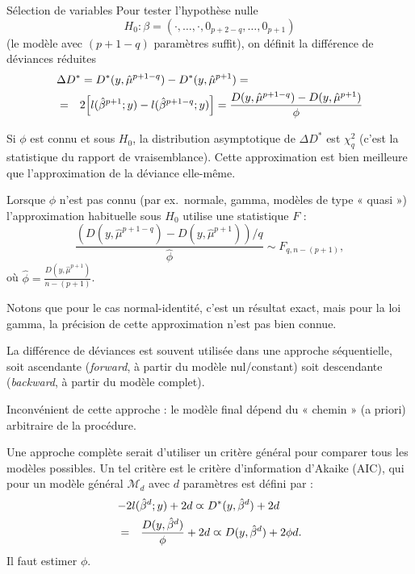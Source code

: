 \documentclass{BeamerTemplate}
\begin{document}
\begin{refsection}
\begin{frame}{Sélection de variables}
\bigskip
Pour tester l'hypothèse nulle
$$H_0: \beta = (\cdot, \ldots, \cdot, 0_{p+2-q},\ldots,0_{p+1})$$
(le modèle avec $(p+1-q)$ paramètres suffit), on
définit la différence de déviances réduites
\begin{eqnarray*}
  \lefteqn{\Delta D^* = D^*(y,\hat{\mu}^{p+1-q}) - D^*(y,\hat{\mu}^{p+1}) = }\\ 
& = & 2 \Big[ l(\hat{\beta}^{p+1};y) - l(\hat{\beta}^{p+1-q};y)\Big] = \frac{D(y,\hat{\mu}^{p+1-q}) - D(y,\hat{\mu}^{p+1})}{\phi}
\end{eqnarray*}

\end{frame}



\begin{frame}{}
Si $\phi$ est connu et sous $H_0$, la distribution asymptotique de $\Delta D^*$ est
$\chi^2_{q}$ (c'est la statistique du rapport de vraisemblance). Cette approximation 
est bien meilleure que l'approximation de la déviance elle-même. 

\bigskip
Lorsque $\phi$ n'est pas connu (par ex.\ normale, gamma, modèles de type « quasi ») l'approximation
habituelle sous 
$H_0$ utilise une statistique $F$ :
$$\frac{(D(y,\hat{\mu}^{p+1-q}) - D(y,\hat{\mu}^{p+1}))/q}{\hat{\phi}} \sim
F_{q,n-(p+1)},$$
où $\hat{\phi}= \frac{D(y,\hat{\mu}^{p+1})}{n-(p+1)}$. 

\bigskip
Notons que pour le cas normal-identité, c'est un résultat exact, mais pour la
loi gamma, la précision de cette approximation n'est pas bien connue.
\end{frame}

\begin{frame}{}
La différence de déviances est souvent utilisée dans une approche séquentielle, soit
ascendante (\textit{forward}, à partir du modèle nul/constant) soit
descendante (\textit{backward}, à partir du modèle complet).

\bigskip
{\color{blue}Inconvénient} de cette approche : le modèle final dépend du
« chemin » (a priori) arbitraire de la procédure.
\end{frame}


\begin{frame}{}
Une approche complète serait d'utiliser un critère général pour comparer tous
les modèles possibles. Un tel critère est le {\color{blue}critère d'information
d'Akaike (AIC)}, qui pour un modèle général ${\mathcal M}_{d}$ avec $d$
paramètres est défini par :
\begin{eqnarray*}
\lefteqn{-2 l(\hat{\beta}^d;y) + 2d  \varpropto   D^*(y,\hat{\beta}^d) + 2d} \\
& = & \frac{D(y,\hat{\beta}^d)}{\phi} + 2 d \varpropto  D(y,\hat{\beta}^d) + 2 \phi d.
\end{eqnarray*}
Il faut estimer $\phi$.


\end{frame}
\end{refsection}
\end{document}
